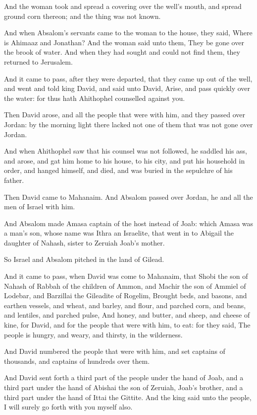 \Verse And the woman took and spread a covering over the well's mouth, and spread ground corn thereon; and the thing was not known.

\Verse And when Absalom's servants came to the woman to the house, they said, Where is Ahimaaz and Jonathan? And the woman said unto them, They be gone over the brook of water. And when they had sought and could not find them, they returned to Jerusalem.

\Verse And it came to pass, after they were departed, that they came up out of the well, and went and told king David, and said unto David, Arise, and pass quickly over the water: for thus hath Ahithophel counselled against you.

\Verse Then David arose, and all the people that were with him, and they passed over Jordan: by the morning light there lacked not one of them that was not gone over Jordan.

\Verse And when Ahithophel saw that his counsel was not followed, he saddled his ass, and arose, and gat him home to his house, to his city, and put his household in order, and hanged himself, and died, and was buried in the sepulchre of his father.

\Verse Then David came to Mahanaim. And Absalom passed over Jordan, he and all the men of Israel with him.

\Verse And Absalom made Amasa captain of the host instead of Joab: which Amasa was a man's son, whose name was Ithra an Israelite, that went in to Abigail the daughter of Nahash, sister to Zeruiah Joab's mother.

\Verse So Israel and Absalom pitched in the land of Gilead.

\Verse And it came to pass, when David was come to Mahanaim, that Shobi the son of Nahash of Rabbah of the children of Ammon, and Machir the son of Ammiel of Lodebar, and Barzillai the Gileadite of Rogelim, \Verse Brought beds, and basons, and earthen vessels, and wheat, and barley, and flour, and parched corn, and beans, and lentiles, and parched pulse, \Verse And honey, and butter, and sheep, and cheese of kine, for David, and for the people that were with him, to eat: for they said, The people is hungry, and weary, and thirsty, in the wilderness.


\Chapter
\Verse And David numbered the people that were with him, and set captains of thousands, and captains of hundreds over them.

\Verse And David sent forth a third part of the people under the hand of Joab, and a third part under the hand of Abishai the son of Zeruiah, Joab's brother, and a third part under the hand of Ittai the Gittite.  And the king said unto the people, I will surely go forth with you myself also.

